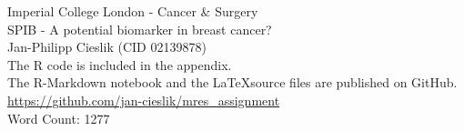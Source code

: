 \documentclass[11pt,a4paper,hidelinks]{article}
\begin{document}
\begin{titlepage}
	\centering
	{Imperial College London - Cancer \& Surgery}\\
	\vspace{12cm}
	{\huge{SPIB - A potential biomarker in breast cancer?}}\\
	\vspace{3cm}
	Jan-Philipp Cieslik (CID 02139878) \\
	\vspace{3cm}
	The R code is included in the appendix. \\
	The R-Markdown notebook and the \LaTeX source files are published on GitHub. \url{https://github.com/jan-cieslik/mres_assignment}\\
	\vspace{1cm}
	Word Count: 1277
    
\end{titlepage}

\newpage
\justifying
{} 










\newpage

 
\newpage
\printbibliography

\newpage
{} 


\end{document}
